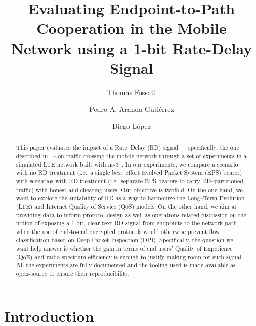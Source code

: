 \documentclass[12pt]{article}
\begin{document}
\title{
  Evaluating Endpoint-to-Path Cooperation in the Mobile Network using a 1-bit
  Rate-Delay Signal
}

\author[$\dagger$]{Thomas Fossati}
\author[$\star$]{Pedro A. Aranda Gutiérrez}
\author[$\ddag$]{Diego López}


\maketitle

\begin{abstract}
This paper evaluates the impact of a Rate–Delay (RD) signal~\cite{PodlesnyG08}
-- specifically, the one described in~\cite{you-tsvwg-latency-loss-tradeoff-00}
-- on traffic crossing the mobile network through a set of experiments in a
simulated LTE network built with ns-3~\cite{ns3}.  In our experiments, we
compare a scenario with no RD treatment (i.e. a single best–effort Evolved
Packet System (EPS) bearer) with scenarios with RD treatment (i.e. separate EPS
bearers to carry RD–partitioned traffic) with honest and cheating users.  Our
objective is twofold:  On the one hand, we want to explore the suitability of
RD as a way to harmonize the Long–Term Evolution (LTE) and Internet Quality of
Service (QoS) models.  On the other hand, we aim at providing data to inform
protocol design as well as operations-related discussion on the notion of
exposing a 1-bit, clear-text RD signal from endpoints to the network path when
the use of end-to-end encrypted protocols would otherwise prevent flow
classification based on Deep Packet Inspection (DPI).  Specifically, the
question we want help answer is whether the gain in terms of end users' Quality
of Experience (QoE) and radio spectrum efficiency is enough to justify making
room for such signal.  All the experiments are fully documented and the tooling
used is made available as open-source to ensure their reproducibility.
\end{abstract}

\section{Introduction}
\label{S:1}
\end{document}
